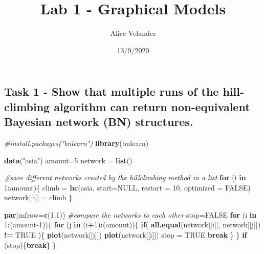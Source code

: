 \documentclass[]{article}
\title{Lab 1 - Graphical Models}
\author{Alice Velander}
\date{13/9/2020}
\newenvironment{Shaded}{\begin{snugshade}}{\end{snugshade}}
\newcommand{\CommentTok}[1]{\textcolor[rgb]{0.56,0.35,0.01}{\textit{#1}}}
\newcommand{\ControlFlowTok}[1]{\textcolor[rgb]{0.13,0.29,0.53}{\textbf{#1}}}
\newcommand{\DataTypeTok}[1]{\textcolor[rgb]{0.13,0.29,0.53}{#1}}
\newcommand{\DecValTok}[1]{\textcolor[rgb]{0.00,0.00,0.81}{#1}}
\newcommand{\KeywordTok}[1]{\textcolor[rgb]{0.13,0.29,0.53}{\textbf{#1}}}
\newcommand{\NormalTok}[1]{#1}
\newcommand{\OperatorTok}[1]{\textcolor[rgb]{0.81,0.36,0.00}{\textbf{#1}}}
\newcommand{\OtherTok}[1]{\textcolor[rgb]{0.56,0.35,0.01}{#1}}
\newcommand{\StringTok}[1]{\textcolor[rgb]{0.31,0.60,0.02}{#1}}
\begin{document}
\maketitle

\begin{Shaded}
\end{Shaded}

\hypertarget{task-1---show-that-multiple-runs-of-the-hill-climbing-algorithm-can-return-non-equivalent-bayesian-network-bn-structures.}{%
\subsection{Task 1 - Show that multiple runs of the hill-climbing
algorithm can return non-equivalent Bayesian network (BN)
structures.}\label{task-1---show-that-multiple-runs-of-the-hill-climbing-algorithm-can-return-non-equivalent-bayesian-network-bn-structures.}}

\begin{Shaded}
\begin{Highlighting}[]
\CommentTok{#install.packages("bnlearn")}
\KeywordTok{library}\NormalTok{(bnlearn)}

\KeywordTok{data}\NormalTok{(}\StringTok{"asia"}\NormalTok{)}
\NormalTok{amount=}\DecValTok{5}
\NormalTok{network =}\StringTok{ }\KeywordTok{list}\NormalTok{()}

\CommentTok{#save different networks created by the hillclimbing method in a list}
\ControlFlowTok{for}\NormalTok{ (i }\ControlFlowTok{in} \DecValTok{1}\OperatorTok{:}\NormalTok{amount)\{}
\NormalTok{  climb =}\StringTok{ }\KeywordTok{hc}\NormalTok{(asia, }\DataTypeTok{start=}\OtherTok{NULL}\NormalTok{, }\DataTypeTok{restart =} \DecValTok{10}\NormalTok{, }\DataTypeTok{optimized =} \OtherTok{FALSE}\NormalTok{)}
\NormalTok{  network[[i]] =}\StringTok{ }\NormalTok{climb   }
\NormalTok{\}}

\KeywordTok{par}\NormalTok{(}\DataTypeTok{mfrow=}\KeywordTok{c}\NormalTok{(}\DecValTok{1}\NormalTok{,}\DecValTok{1}\NormalTok{))}
\CommentTok{#compare the networks to each other }
\NormalTok{stop=}\OtherTok{FALSE}
\ControlFlowTok{for}\NormalTok{ (i }\ControlFlowTok{in} \DecValTok{1}\OperatorTok{:}\NormalTok{(amount}\DecValTok{-1}\NormalTok{))\{}
  \ControlFlowTok{for}\NormalTok{ (j }\ControlFlowTok{in}\NormalTok{ (i}\OperatorTok{+}\DecValTok{1}\NormalTok{)}\OperatorTok{:}\NormalTok{(amount))\{}
    \ControlFlowTok{if}\NormalTok{( }\KeywordTok{all.equal}\NormalTok{(network[[i]], network[[j]]) }\OperatorTok{!=}\StringTok{ }\OtherTok{TRUE}\NormalTok{ )\{}
      \KeywordTok{plot}\NormalTok{(network[[j]])}
      \KeywordTok{plot}\NormalTok{(network[[i]])}
\NormalTok{      stop =}\StringTok{ }\OtherTok{TRUE}
      \ControlFlowTok{break}
\NormalTok{    \}}
\NormalTok{  \}}
  \ControlFlowTok{if}\NormalTok{ (stop)\{}\ControlFlowTok{break}\NormalTok{\}}
\NormalTok{\}}
\end{Highlighting}
\end{Shaded}
\end{document}
